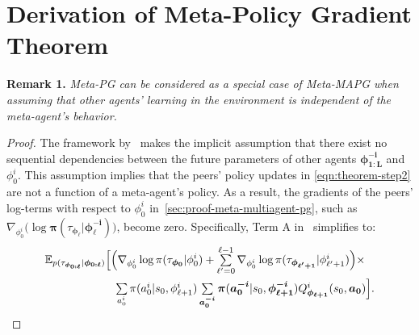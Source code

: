 \newpage
\section{Derivation of Meta-Policy Gradient Theorem}\label{sec:proof-meta-pg}
\textbf{Remark 1.} \textit{
Meta-PG can be considered as a special case of Meta-MAPG when assuming that other agents' learning in the environment is independent of the meta-agent's behavior.}
\begin{proof}
The framework by~\citet{alshedivat2018continuous} makes the implicit assumption that there exist no sequential dependencies between the future parameters of other agents $\bm{\phi}^{\bm{-i}}_{\bm{1:L}}$ and $\phi^{i}_{0}$. 
This assumption implies that the peers' policy updates in \cref{eqn:theorem-step2} are not a function of a meta-agent's policy.
As a result, the gradients of the peers' log-terms with respect to $\phi^{i}_{0}$ in~\cref{sec:proof-meta-multiagent-pg}, such as $\nabla_{\phi^{i}_{0}}\!\Big(\log\bm{\pi}(\tau_{\bm{\phi}_{\bm{\ell}}}|\bm{\phi}^{\bm{-i}}_{\bm{\ell}})\!\Big)$, become zero. 
Specifically, Term A in~ simplifies to:
\begin{align}\label{eqn:simple-theorem-step7}
\begin{split}
\mathbb{E}_{p(\tau_{\bm{\phi}_{\bm{0:\ell}}}|\bm{\phi}_{\bm{0:\ell}})}\Big[&\Big(\nabla_{\phi^{i}_{0}}\log\pi(\tau_{\bm{\phi}_{\bm{0}}}|\phi^{i}_{0})+\textstyle\sum\limits_{\ell'=0}^{\ell-1}\nabla_{\phi^{i}_{0}}\log\pi(\tau_{\bm{\phi_{\ell'+1}}}|\phi^{i}_{\ell'+1})\Big)\times\\
&\;\textstyle\sum\limits_{a^{i}_{0}}\pi(a^{i}_{0}|s_0,\phi^{i}_{\ell+1})\textstyle\sum\limits_{\bm{a}^{\bm{-i}}_{\bm{0}}}\bm{\pi}(\bm{a}^{\bm{-i}}_{\bm{0}}|s_{0},\bm{\phi}^{\bm{-i}}_{\bm{\ell+1}}) Q^{i}_{\bm{\phi}_{\bm{\ell+1}}}(s_{0},\bm{a}_{\bm{0}})
\Big].
\end{split}
\end{align}


\end{proof}
